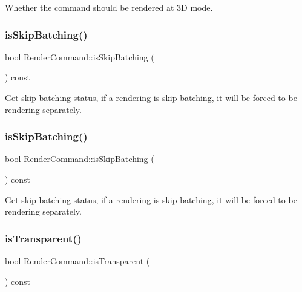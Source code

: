 Whether the command should be rendered at 3D mode. \mbox{\label{classRenderCommand_a365205f076e44d2d88f2e1e3ef19fddf}} 
\subsubsection{\texorpdfstring{is\+Skip\+Batching()}{isSkipBatching()}\hspace{0.1cm}{\footnotesize\ttfamily [1/2]}}
{\footnotesize\ttfamily bool Render\+Command\+::is\+Skip\+Batching (\begin{DoxyParamCaption}{ }\end{DoxyParamCaption}) const\hspace{0.3cm}{\ttfamily [inline]}}

Get skip batching status, if a rendering is skip batching, it will be forced to be rendering separately. \mbox{\label{classRenderCommand_a365205f076e44d2d88f2e1e3ef19fddf}} 
\subsubsection{\texorpdfstring{is\+Skip\+Batching()}{isSkipBatching()}\hspace{0.1cm}{\footnotesize\ttfamily [2/2]}}
{\footnotesize\ttfamily bool Render\+Command\+::is\+Skip\+Batching (\begin{DoxyParamCaption}{ }\end{DoxyParamCaption}) const\hspace{0.3cm}{\ttfamily [inline]}}

Get skip batching status, if a rendering is skip batching, it will be forced to be rendering separately. \mbox{\label{classRenderCommand_ae1fd8d457e581f0dc5bd7ba1f713f815}} 
\subsubsection{\texorpdfstring{is\+Transparent()}{isTransparent()}\hspace{0.1cm}{\footnotesize\ttfamily [1/2]}}
{\footnotesize\ttfamily bool Render\+Command\+::is\+Transparent (\begin{DoxyParamCaption}{ }\end{DoxyParamCaption}) const\hspace{0.3cm}{\ttfamily [inline]}}

